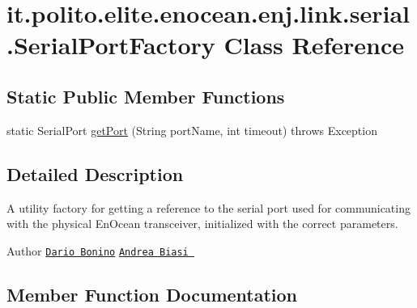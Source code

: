 \hypertarget{classit_1_1polito_1_1elite_1_1enocean_1_1enj_1_1link_1_1serial_1_1_serial_port_factory}{}\section{it.\+polito.\+elite.\+enocean.\+enj.\+link.\+serial.\+Serial\+Port\+Factory Class Reference}
\label{classit_1_1polito_1_1elite_1_1enocean_1_1enj_1_1link_1_1serial_1_1_serial_port_factory}
\subsection*{Static Public Member Functions}
\begin{DoxyCompactItemize}
\item 
static Serial\+Port \hyperlink{classit_1_1polito_1_1elite_1_1enocean_1_1enj_1_1link_1_1serial_1_1_serial_port_factory_a1401b4b89998c201a2b3b424c6b7efad}{get\+Port} (String port\+Name, int timeout)  throws Exception 	
\end{DoxyCompactItemize}


\subsection{Detailed Description}
A utility factory for getting a reference to the serial port used for communicating with the physical En\+Ocean transceiver, initialized with the correct parameters.

\begin{DoxyAuthor}{Author}
\href{mailto:dario.bonino@gmail.com}{\tt Dario Bonino}  \href{mailto:biasiandrea04@gmail.com}{\tt Andrea Biasi } 
\end{DoxyAuthor}


\subsection{Member Function Documentation}
\hypertarget{classit_1_1polito_1_1elite_1_1enocean_1_1enj_1_1link_1_1serial_1_1_serial_port_factory_a1401b4b89998c201a2b3b424c6b7efad}{}\label{classit_1_1polito_1_1elite_1_1enocean_1_1enj_1_1link_1_1serial_1_1_serial_port_factory_a1401b4b89998c201a2b3b424c6b7efad} 
